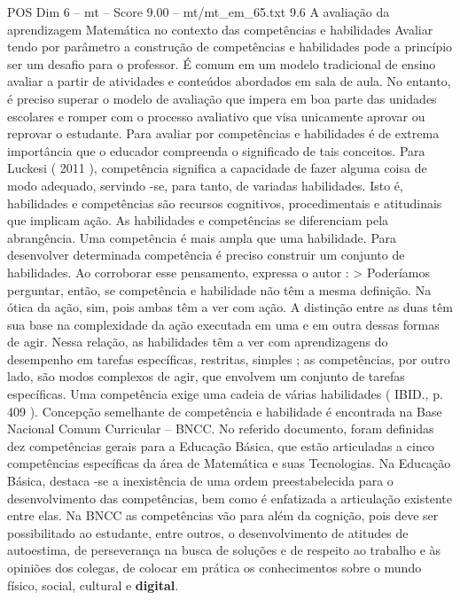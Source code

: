 \begin{textsample}{POS Dim 6 – mt – Score 9.00 – mt/mt\_em\_65.txt}  \label{ex:f6_pos_164}
9.6 A avaliação da aprendizagem Matemática no contexto das competências e habilidades Avaliar tendo por parâmetro a construção de competências e habilidades pode a princípio ser um desafio para o professor.
É comum em um modelo tradicional de ensino avaliar a partir de atividades e conteúdos abordados em sala de aula.
No entanto, é preciso superar o modelo de avaliação que impera em boa parte das unidades escolares e romper com o processo avaliativo que visa unicamente aprovar ou reprovar o estudante.
Para avaliar por competências e habilidades é de extrema importância que o educador compreenda o significado de tais conceitos.
Para Luckesi ( 2011 ), competência significa a capacidade de fazer alguma coisa de modo adequado, servindo -se, para tanto, de variadas habilidades.
Isto é, habilidades e competências são recursos cognitivos, procedimentais e atitudinais que implicam ação.
As habilidades e competências se diferenciam pela abrangência.
Uma competência é mais ampla que uma habilidade.
Para desenvolver determinada competência é preciso construir um conjunto de habilidades.
Ao corroborar esse pensamento, expressa o autor : > Poderíamos perguntar, então, se competência e habilidade não têm a mesma definição.
Na ótica da ação, sim, pois ambas têm a ver com ação.
A distinção entre as duas têm sua base na complexidade da ação executada em uma e em outra dessas formas de agir.
Nessa relação, as habilidades têm a ver com aprendizagens do desempenho em tarefas específicas, restritas, simples ; as competências, por outro lado, são modos complexos de agir, que envolvem um conjunto de tarefas específicas.
Uma competência exige uma cadeia de várias habilidades ( IBID., p. 409 ).
Concepção semelhante de competência e habilidade é encontrada na Base Nacional Comum Curricular – BNCC.
No referido documento, foram definidas dez competências gerais para a Educação Básica, que estão articuladas a cinco competências específicas da área de Matemática e suas Tecnologias.
Na Educação Básica, destaca -se a inexistência de uma ordem preestabelecida para o desenvolvimento das competências, bem como é enfatizada a articulação existente entre elas.
Na BNCC as competências vão para além da cognição, pois deve ser possibilitado ao estudante, entre outros, o desenvolvimento de atitudes de autoestima, de perseverança na busca de soluções e de respeito ao trabalho e às opiniões dos colegas, de colocar em prática os conhecimentos sobre o mundo físico, social, cultural e \textbf{digital}.

\end{textsample}

